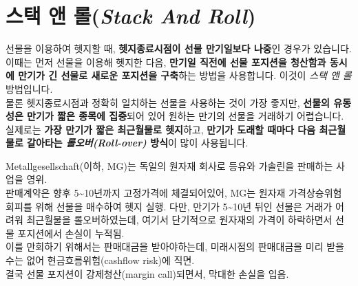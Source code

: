\documentclass[
  letterpaper,
  DIV=11,
  numbers=noendperiod]{scrreprt}
\begin{document}
\section*{\texorpdfstring{스택 앤 롤(\emph{Stack And
Roll})}{스택 앤 롤(Stack And Roll)}}\label{uxc2a4uxd0dd-uxc564-uxb864stack-and-roll}


선물을 이용하여 헷지할 때, \textbf{헷지종료시점이 선물 만기일보다
나중}인 경우가 있습니다. 이때는 먼저 선물을 이용해 헷지한 다음,
\textbf{만기일 직전에 선물 포지션을 청산함과 동시에 만기가 긴 선물로
새로운 포지션을 구축}하는 방법을 사용합니다. 이것이 \emph{스택 앤 롤}
방법입니다.\\
물론 헷지종료시점과 정확히 일치하는 선물을 사용하는 것이 가장 좋지만,
\textbf{선물의 유동성은 만기가 짧은 종목에 집중}되어 있어 원하는 만기의
선물을 거래하기 어렵습니다. 실제로는 \textbf{가장 만기가 짧은 최근월물로
헷지}하고, \textbf{만기가 도래할 때마다 다음 최근월물로 갈아타는
\emph{롤오버(Roll-over)} 방식}이 많이 사용됩니다.

\begin{tcolorbox}[enhanced jigsaw, toprule=.15mm, breakable, left=2mm, leftrule=.75mm, opacitybacktitle=0.6, coltitle=black, rightrule=.15mm, colback=white, titlerule=0mm, bottomtitle=1mm, colframe=quarto-callout-tip-color-frame, title=\textcolor{quarto-callout-tip-color}{\faLightbulb}\hspace{0.5em}{Stack and Roll의 위험성 : Metallgesellschaft 사례}, toptitle=1mm, arc=.35mm, colbacktitle=quarto-callout-tip-color!10!white, opacityback=0, bottomrule=.15mm]

Metallgesellschaft(이하, MG)는 독일의 원자재 회사로 등유와 가솔린을
판매하는 사업을 영위.\\
판매계약은 향후 5\textasciitilde10년까지 고정가격에 체결되어있어, MG는
원자재 가격상승위험 회피를 위해 선물을 매수하여 헷지 실행. 다만, 만기가
5\textasciitilde10년 뒤인 선물은 거래가 어려워 최근월물을
롤오버하였는데, 여기서 단기적으로 원자재의 가격이 하락하면서 선물
포지션에서 손실이 누적됨.\\
이를 만회하기 위해서는 판매대금을 받아야하는데, 미래시점의 판매대금을
미리 받을 수는 없어 현금흐름위험(cashflow risk)에 직면.\\
결국 선물 포지션이 강제청산(margin call)되면서, 막대한 손실을 입음.

\end{tcolorbox}
\end{document}
